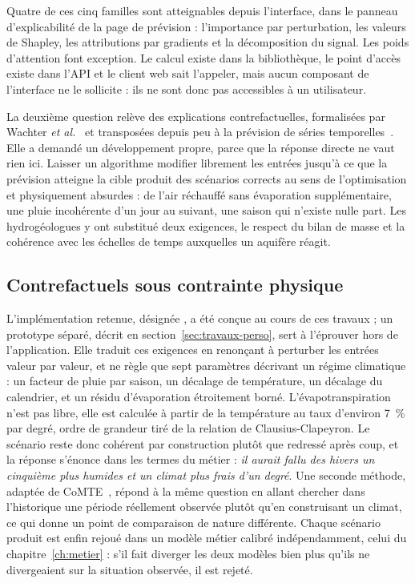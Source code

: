 Quatre de ces cinq familles sont atteignables depuis l'interface, dans le panneau
d'explicabilité de la page de prévision : l'importance par perturbation, les valeurs de Shapley,
les attributions par gradients et la décomposition du signal. Les poids d'attention font
exception. Le calcul existe dans la bibliothèque, le point d'accès existe dans l'API et le
client web sait l'appeler, mais aucun composant de l'interface ne le sollicite : ils ne sont donc
pas accessibles à un utilisateur.

La deuxième question relève des explications contrefactuelles, formalisées par Wachter
\emph{et al.}~\cite{wachter2018counterfactual} et transposées depuis peu à la prévision de
séries temporelles~\cite{wang2023forecastcf}. Elle a demandé un développement propre, parce que
la réponse directe ne vaut rien ici. Laisser un algorithme modifier librement les entrées jusqu'à ce que la prévision
atteigne la cible produit des scénarios corrects au sens de l'optimisation et physiquement
absurdes : de l'air réchauffé sans évaporation supplémentaire, une pluie incohérente d'un jour
au suivant, une saison qui n'existe nulle part. Les hydrogéologues y ont substitué deux
exigences, le respect du bilan de masse et la cohérence avec les échelles de temps auxquelles un
aquifère réagit.

\subsection{Contrefactuels sous contrainte physique}
\label{sec:physcf}

L'implémentation retenue, désignée \physcf{}, a été conçue au cours de ces travaux ; un
prototype séparé, décrit en section~\ref{sec:travaux-perso}, sert à l'éprouver hors de
l'application. Elle traduit ces exigences en renonçant à perturber les entrées valeur par
valeur, et ne règle que sept paramètres décrivant un régime climatique : un facteur de pluie par
saison, un décalage de température, un décalage du calendrier, et un résidu d'évaporation
étroitement borné. L'évapotranspiration n'est pas libre, elle est calculée à partir de la
température au taux d'environ \SI{7}{\percent} par degré, ordre de grandeur tiré de la relation
de Clausius-Clapeyron. Le scénario reste donc cohérent par construction plutôt que redressé
après coup, et la réponse s'énonce dans les termes du métier : \emph{il aurait fallu des hivers
un cinquième plus humides et un climat plus frais d'un degré}. Une seconde méthode, adaptée de
CoMTE~\cite{ates2021comte}, répond à la même question en allant chercher dans l'historique une
période réellement observée plutôt qu'en construisant un climat, ce qui donne un point de
comparaison de nature différente. Chaque scénario produit est enfin rejoué dans un modèle métier
calibré indépendamment, celui du chapitre~\ref{ch:metier} : s'il fait diverger les deux modèles
bien plus qu'ils ne divergeaient sur la situation observée, il est rejeté.

